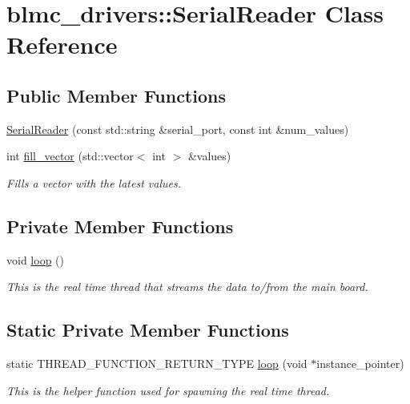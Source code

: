 \hypertarget{classblmc__drivers_1_1SerialReader}{}\section{blmc\+\_\+drivers\+:\+:Serial\+Reader Class Reference}
\label{classblmc__drivers_1_1SerialReader}
\subsection*{Public Member Functions}
\begin{DoxyCompactItemize}
\item 
\hyperlink{classblmc__drivers_1_1SerialReader_a894216b6799b0ea9945f8a1cf98f9801}{Serial\+Reader} (const std\+::string \&serial\+\_\+port, const int \&num\+\_\+values)
\item 
int \hyperlink{classblmc__drivers_1_1SerialReader_aa590c82f97cfa6d9222bc3d19952f166}{fill\+\_\+vector} (std\+::vector$<$ int $>$ \&values)
\begin{DoxyCompactList}\small\item\em Fills a vector with the latest values. \end{DoxyCompactList}\end{DoxyCompactItemize}
\subsection*{Private Member Functions}
\begin{DoxyCompactItemize}
\item 
\mbox{\label{classblmc__drivers_1_1SerialReader_a24a8f28fa8e56934baa1d0b9fef7a045}} 
void \hyperlink{classblmc__drivers_1_1SerialReader_a24a8f28fa8e56934baa1d0b9fef7a045}{loop} ()
\begin{DoxyCompactList}\small\item\em This is the real time thread that streams the data to/from the main board. \end{DoxyCompactList}\end{DoxyCompactItemize}
\subsection*{Static Private Member Functions}
\begin{DoxyCompactItemize}
\item 
static T\+H\+R\+E\+A\+D\+\_\+\+F\+U\+N\+C\+T\+I\+O\+N\+\_\+\+R\+E\+T\+U\+R\+N\+\_\+\+T\+Y\+PE \hyperlink{classblmc__drivers_1_1SerialReader_aaa18311d9c274b0ac8a8bd86a311d3fc}{loop} (void $\ast$instance\+\_\+pointer)
\begin{DoxyCompactList}\small\item\em This is the helper function used for spawning the real time thread. \end{DoxyCompactList}\end{DoxyCompactItemize}

